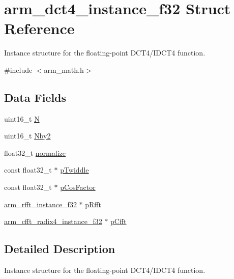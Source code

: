 \hypertarget{structarm__dct4__instance__f32}{}\section{arm\+\_\+dct4\+\_\+instance\+\_\+f32 Struct Reference}
\label{structarm__dct4__instance__f32}


Instance structure for the floating-\/point D\+C\+T4/\+I\+D\+C\+T4 function.  




{\ttfamily \#include $<$arm\+\_\+math.\+h$>$}

\subsection*{Data Fields}
\begin{DoxyCompactItemize}
\item 
uint16\+\_\+t \mbox{\hyperlink{structarm__dct4__instance__f32_a37d49571fe35012087153c093705cd11}{N}}
\item 
uint16\+\_\+t \mbox{\hyperlink{structarm__dct4__instance__f32_afa64b1618089e35c2b55cff71cb29715}{Nby2}}
\item 
float32\+\_\+t \mbox{\hyperlink{structarm__dct4__instance__f32_a1bf2ed86ef2c3dd83af606bb3f520f2a}{normalize}}
\item 
const float32\+\_\+t $\ast$ \mbox{\hyperlink{structarm__dct4__instance__f32_a8292d9775f5c5472f59915649fe3b378}{p\+Twiddle}}
\item 
const float32\+\_\+t $\ast$ \mbox{\hyperlink{structarm__dct4__instance__f32_a6978f973c110508f6086347c87eaea7a}{p\+Cos\+Factor}}
\item 
\mbox{\hyperlink{structarm__rfft__instance__f32}{arm\+\_\+rfft\+\_\+instance\+\_\+f32}} $\ast$ \mbox{\hyperlink{structarm__dct4__instance__f32_ad4cd7c85eea3f7c5fff4630bbd979e6a}{p\+Rfft}}
\item 
\mbox{\hyperlink{structarm__cfft__radix4__instance__f32}{arm\+\_\+cfft\+\_\+radix4\+\_\+instance\+\_\+f32}} $\ast$ \mbox{\hyperlink{structarm__dct4__instance__f32_ab7bd4d374a1780dea50efd3e7ac220be}{p\+Cfft}}
\end{DoxyCompactItemize}


\subsection{Detailed Description}
Instance structure for the floating-\/point D\+C\+T4/\+I\+D\+C\+T4 function. 

